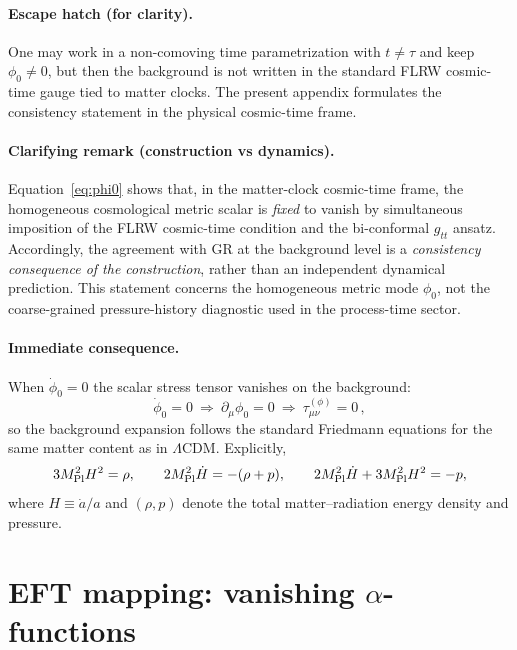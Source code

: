 \documentclass[11pt]{article}
\newcommand{\Mpl}{M_{\rm Pl}}
\newcommand{\LCDM}{$\Lambda$CDM}
\begin{document}
\paragraph{Escape hatch (for clarity).}
One may work in a non-comoving time parametrization with $t\neq\tau$ and keep
$\phi_0\neq0$, but then the background is not written in the standard FLRW
cosmic-time gauge tied to matter clocks. The present appendix formulates the
consistency statement in the physical cosmic-time frame.


\paragraph{Clarifying remark (construction vs dynamics).}
Equation~\eqref{eq:phi0} shows that, in the matter-clock cosmic-time frame, the homogeneous
cosmological metric scalar is \emph{fixed} to vanish by simultaneous imposition of the FLRW
cosmic-time condition and the bi-conformal $g_{tt}$ ansatz. Accordingly, the agreement with GR at
the background level is a \emph{consistency consequence of the construction}, rather than an
independent dynamical prediction. This statement concerns the homogeneous metric mode
$\phi_0$, not the coarse-grained pressure-history diagnostic used in the process-time sector.

\paragraph{Immediate consequence.}
When $\dot\phi_0=0$ the scalar stress tensor vanishes on the background:
\begin{equation}
\dot\phi_0=0 \ \Rightarrow\  \partial_\mu\phi_0=0 \ \Rightarrow\ 
\tau^{(\phi)}_{\mu\nu}=0\,,
\end{equation}
so the background expansion follows the standard Friedmann equations for the
same matter content as in \LCDM{}. Explicitly,
\begin{equation}
3\Mpl^2 H^2 = \rho,\qquad 2\Mpl^2\dot H = -(\rho+p),\qquad 2\Mpl^2\dot H + 3\Mpl^2 H^2 = -p,
\label{eq:friedmann_app9}
\end{equation}
where $H\equiv \dot a/a$ and $(\rho,p)$ denote the total matter--radiation energy
density and pressure.

\section{EFT mapping: vanishing $\alpha$-functions}
\label{sec:eft}
\end{document}
